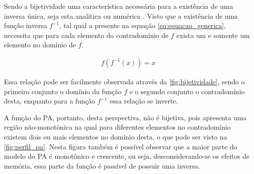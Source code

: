 Sendo a bijetividade uma característica necessária para a existência de uma inversa única, seja esta analítica ou numérica \cite{weisstein}. Visto que a existência de uma função inversa $f^{-1}$, tal qual a presente na equação \ref{eq:equacao_generica}, necessita que para cada elemento do contradomínio de $f$ exista um e somente um elemento no domínio de $f$.

\begin{align}
f(f^{-1}(x)) = x
\label{eq:equacao_generica}
\end{align}

Essa relação pode ser facilmente observada através da \autoref{fig:bijetividade}, sendo o primeiro conjunto o domínio da função $f$ e o segundo conjunto o contradomínio desta, enquanto para a função $f^{-1}$ essa relação se inverte.


A função do PA, portanto, desta perspectiva, não é bijetiva, pois apresenta uma região não-monotônica na qual para diferentes elementos no contradomínio existem dois ou mais elementos no domínio desta, o que pode ser visto na \autoref{fig:perfil_pa}. Nesta figura também é possível observar que a maior parte do modelo do PA é monotônico e crescente, ou seja, desconsiderando-se os efeitos de memória, essa parte da função é passível de possuir uma inversa.

